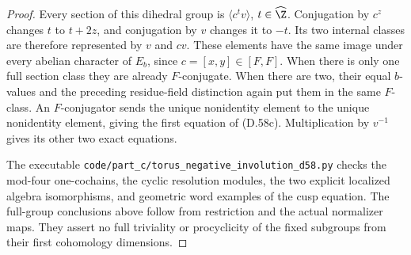 \begin{proof}
Every section of this dihedral group is
$\langle c^t v\rangle$, $t\in\widehat\Z$.
Conjugation by $c^z$ changes $t$ to $t+2z$,
and conjugation by $v$ changes it to $-t$.
Its two internal classes are therefore represented
by $v$ and $cv$.
These elements have the same image under every
abelian character of $E_b$, since $c=[x,y]\in[F,F]$.
When there is only one full section class they
are already $F$-conjugate.
When there are two, their equal $b$-values and
the preceding residue-field distinction again
put them in the same $F$-class.
An $F$-conjugator sends the unique nonidentity
element to the unique nonidentity element, giving
the first equation of (D.58c).
Multiplication by $v^{-1}$ gives its other
two exact equations.

The executable
\texttt{code/part\_c/torus\_negative\_involution\_d58.py}
checks the mod-four one-cochains, the cyclic
resolution modules, the two explicit localized
algebra isomorphisms, and geometric word examples
of the cusp equation.
The full-group conclusions above follow from
restriction and the actual normalizer maps.
They assert no full triviality or procyclicity
of the fixed subgroups from their first
cohomology dimensions.
\end{proof}
